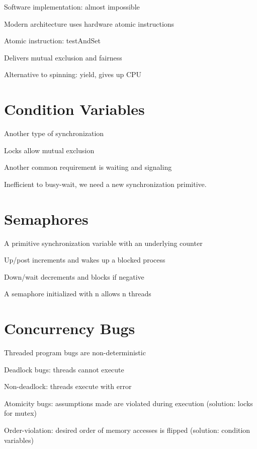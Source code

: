 \documentclass[12pt]{article}
\begin{document}
Software implementation: almost impossible

Modern architecture uses hardware atomic instructions

Atomic instruction: testAndSet

Delivers mutual exclusion and fairness

Alternative to spinning: yield, gives up CPU

\section{Condition Variables}

Another type of synchronization

Locks allow mutual exclusion

Another common requirement is waiting and signaling

Inefficient to busy-wait, we need a new synchronization primitive.

\section{Semaphores}

A primitive synchronization variable with an underlying counter

Up/post increments and wakes up a blocked process

Down/wait decrements and blocks if negative

A semaphore initialized with n allows n threads

\section{Concurrency Bugs}

Threaded program bugs are non-deterministic

Deadlock bugs: threads cannot execute

Non-deadlock: threads execute with error

Atomicity bugs: assumptions made are violated during execution (solution: locks for mutex)

Order-violation: desired order of memory accesses is flipped (solution: condition variables)
\end{document}
